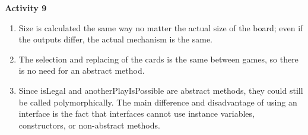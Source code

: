\documentclass[12pt]{article}
\begin{document}
\textbf{Activity 9}
\begin{enumerate}
\item Size is calculated the same way no matter the actual size of the board;
  even if the outputs differ, the actual mechanism is the same. 
\item The selection and replacing of the cards is the same between games, so
  there is no need for an abstract method. 
\item Since isLegal and anotherPlayIsPossible are abstract methods, they could
  still be called polymorphically. The main difference and disadvantage of using
  an interface is the fact that interfaces cannot use instance variables,
  constructors, or non-abstract methods.
\end{enumerate}
\end{document}
